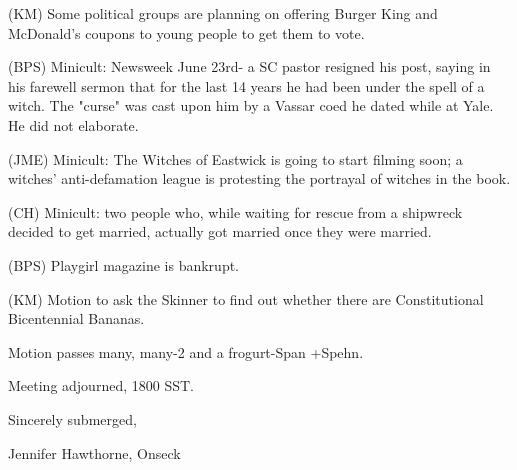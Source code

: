 \documentclass[12pt]{article}
\begin{document}
(KM) Some political groups are planning on offering Burger King and McDonald's coupons to young people to get them to vote.

(BPS) Minicult: Newsweek June 23rd- a SC pastor resigned his post, saying in his farewell sermon that for the last 14 years he had been under the spell of a witch. The "curse" was cast upon him by a Vassar coed he dated while at Yale. He did not elaborate.

(JME) Minicult: The Witches of Eastwick is going to start filming soon; a witches' anti-defamation league is protesting the portrayal of witches in the book.

(CH) Minicult: two people who, while waiting for rescue from a shipwreck decided to get married, actually got married once they were married.

(BPS) Playgirl magazine is bankrupt.

(KM) Motion to ask the Skinner to find out whether there are Constitutional Bicentennial Bananas.

Motion passes many, many-2 and a frogurt-Span +Spehn.

\vspace{12pt}

\noindent
Meeting adjourned, 1800 SST.

\vspace{18pt}

\centerline{Sincerely submerged,}
\centerline{Jennifer Hawthorne, Onseck}
\end{document}
